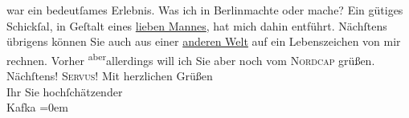 \begin{ledgroupsized}[t]{13cm}
{{{               }}}\label{K_L00162-2h} war ein bedeutſames Erlebnis.\pend
           \pstart
           Was ich in Berlin\introOben{}machte oder\introOben{} mache? Ein gütiges Schickſal, in Geſtalt eines
                  \uline{lieben Mannes}, hat mich dahin  entführt. Nächſtens {\pb}übrigens können Sie auch aus einer \uline{anderen Welt} auf ein Lebenszeichen von mir rechnen.
               Vorher \substVorne{}\textsuperscript{aber}\substDazwischen{}allerdings\substHinten{} will ich Sie \introOben{}aber\introOben{} noch vom \textsc{Nordcap} grüßen. Nächſtens!\pend
           \pstart
           \textsc{Servus}! Mit herzlichen Grüßen{\\[\baselineskip]}Ihr Sie hochſchätzender{\\[\baselineskip]}\spacefill\mbox{Kafka}\pend
           \leftskip=0em{}
         
         \endnumbering{}\end{ledgroupsized}  \newcommand{\dateiname}{L00162}\newcommand{\titel}{Eduard Michael Kafka an Arthur Schnitzler, 24. 1. 1893}\newcommand{\editorInnen}{Martin Anton Müller und Gerd-Hermann Susen}
      
